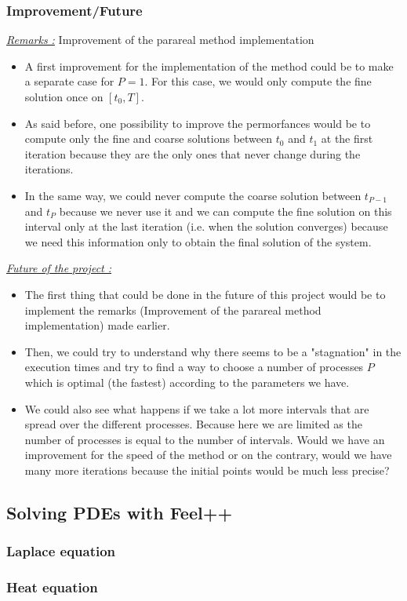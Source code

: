 \subsubsection{Improvement/Future}

\noindent \underline{\textit{Remarks :}} Improvement of the parareal method implementation 

\begin{itemize}[label=-]
	\item A first improvement for the implementation of the method could be to make a separate case for $P=1$. For this case, we would only compute the fine solution once on $[t_0,T]$.
	\item As said before, one possibility to improve the permorfances would be to compute only the fine and coarse solutions between $t_0$ and $t_1$ at the first iteration because they are the only ones that never change during the iterations. 
	\item In the same way, we could never compute the coarse solution between $t_{P-1}$ and $t_P$ because we never use it and we can compute the fine solution on this interval only at the last iteration (i.e. when the solution converges) because we need this information only to obtain the final solution of the system.
\end{itemize}

\noindent \underline{\textit{Future of the project :}}

\begin{itemize}[label=-]
	\item The first thing that could be done in the future of this project would be to implement the remarks (Improvement of the parareal method implementation) made earlier.
	\item Then, we could try to understand why there seems to be a "stagnation" in the execution times and try to find a way to choose a number of processes $P$ which is optimal (the fastest) according to the parameters we have.
	\item We could also see what happens if we take a lot more intervals that are spread over the different processes. Because here we are limited as the number of processes is equal to the number of intervals. Would we have an improvement for the speed of the method or on the contrary, would we have many more iterations because the initial points would be much less precise?
\end{itemize}



\subsection{Solving PDEs with Feel++}

\subsubsection{Laplace equation}

\subsubsection{Heat equation}
\label{heat}